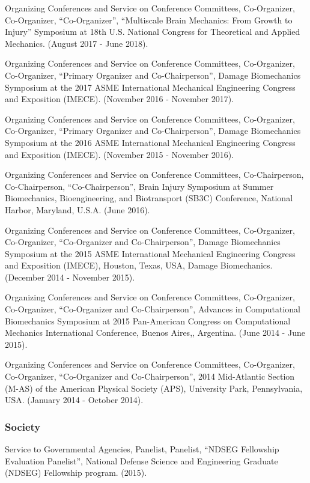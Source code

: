 \documentclass[11pt]{article}
\begin{document}
Organizing Conferences and Service on Conference Committees,
Co-Organizer, Co-Organizer, ``Co-Organizer'', ``Multiscale Brain Mechanics:
From Growth to Injury'' Symposium at 18th U.S. 
National Congress for
Theoretical and Applied Mechanics. 
(August 2017 - June 2018).

Organizing Conferences and Service on Conference Committees,
Co-Organizer, Co-Organizer, ``Primary Organizer and Co-Chairperson'',
Damage Biomechanics Symposium at the 2017 ASME International Mechanical
Engineering Congress and Exposition (IMECE). 
(November 2016 - November
2017).

Organizing Conferences and Service on Conference Committees,
Co-Organizer, Co-Organizer, ``Primary Organizer and Co-Chairperson'',
Damage Biomechanics Symposium at the 2016 ASME International Mechanical
Engineering Congress and Exposition (IMECE). 
(November 2015 - November
2016).

Organizing Conferences and Service on Conference Committees,
Co-Chairperson, Co-Chairperson, ``Co-Chairperson'', Brain Injury Symposium
at Summer Biomechanics, Bioengineering, and Biotransport (SB3C)
Conference, National Harbor, Maryland, U.S.A. 
(June 2016).

Organizing Conferences and Service on Conference Committees,
Co-Organizer, Co-Organizer, ``Co-Organizer and Co-Chairperson'', Damage
Biomechanics Symposium at the 2015 ASME International Mechanical
Engineering Congress and Exposition (IMECE), Houston, Texas, USA, Damage
Biomechanics. 
(December 2014 - November 2015).

Organizing Conferences and Service on Conference Committees,
Co-Organizer, Co-Organizer, ``Co-Organizer and Co-Chairperson'', Advances
in Computational Biomechanics Symposium at 2015 Pan-American Congress on
Computational Mechanics International Conference, Buenos Aires,,
Argentina. 
(June 2014 - June 2015).

Organizing Conferences and Service on Conference Committees,
Co-Organizer, Co-Organizer, ``Co-Organizer and Co-Chairperson'', 2014
Mid-Atlantic Section (M-AS) of the American Physical Society (APS),
University Park, Pennsylvania, USA. 
(January 2014 - October 2014).

\subsubsection{Society}\label{society}

Service to Governmental Agencies, Panelist, Panelist, ``NDSEG
Fellowship Evaluation Panelist'', National Defense Science and
Engineering Graduate (NDSEG) Fellowship program. 
(2015).
\end{document}
